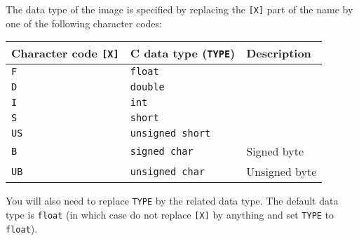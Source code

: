 \documentclass[twoside,11pt]{article}
\renewcommand{\_}{\texttt{\symbol{95}}}
\begin{document}
\label{IMGCdatatypes}
The data type of the image is specified by replacing the \texttt{[X]} part
of the name by one of the following character codes:
\begin{small}
\begin{center}
\begin{tabular}{||l|l|l||}
\hline
Character code {\tt [X]} & C data type (\texttt{TYPE}) &  Description \\
\hline
 \texttt{F}       & \texttt{float}          &   \\
 \texttt{D}       & \texttt{double}         &  \\
 \texttt{I}       & \texttt{int}            &  \\
 \texttt{S}       & \texttt{short}          &  \\
 \texttt{US}      & \texttt{unsigned short} &  \\
 \texttt{B}       & \texttt{signed char}    &  Signed byte      \\
 \texttt{UB}      & \texttt{unsigned char}  &  Unsigned byte    \\
\hline
\end{tabular}
\end{center}
\end{small}
You will also need to replace \texttt{TYPE} by the related data type.
The default data type is \texttt{float} (in which case do not replace
\texttt{[X]} by anything and set \texttt{TYPE} to \texttt{float}).
\end{document}
